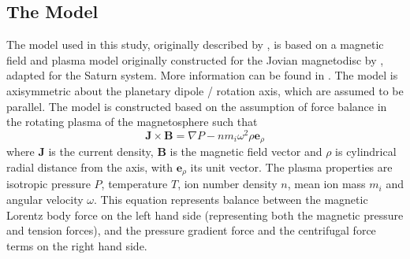\subsection{The Model}\label{compress:sec:model}
The model used in this study, originally described by \citet{achilleos2010a}, is based on a magnetic field and plasma model originally constructed for the Jovian magnetodisc by \citet{caudal1986}, adapted for the Saturn system. More information can be found in \citet{achilleos2010a, achilleos2010b}. The model is axisymmetric about the planetary dipole / rotation axis, which are assumed to be parallel. The model is constructed based on the assumption of force balance in the rotating plasma of the magnetosphere such that 
\begin{equation}\label{compress:eq:forcebalance}
\boldsymbol{J} \times \boldsymbol{B} = \nabla P - nm_i\omega^2\rho\boldsymbol{e}_\rho
\end{equation}
where $\boldsymbol{J}$ is the current density, $\boldsymbol{B}$ is the magnetic field vector and $\rho$ is cylindrical radial distance from the axis, with $\boldsymbol{e}_\rho$ its unit vector. The plasma properties are isotropic pressure $P$, temperature $T$, ion number density $n$, mean ion mass $m_i$ and angular velocity $\omega$. This equation represents balance between the magnetic Lorentz body force on the left hand side (representing both the magnetic pressure and tension forces), and the pressure gradient force and the centrifugal force terms on the right hand side.

